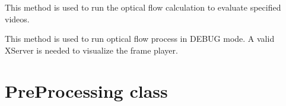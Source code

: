 \documentclass[letterpaper,10pt,english,openany,oneside]{sphinxmanual}
\begin{document}
\begin{fulllineitems}
\begin{fulllineitems}
\begin{quote}
\begin{description}
\end{description}\end{quote}

\end{fulllineitems}


\begin{fulllineitems}
\label{\detokenize{OpticalFlow:cmc.OpticalFlow.OpticalFlow.run_eval}}
This method is used to run the optical flow calculation to evaluate specified videos.

\end{fulllineitems}


\begin{fulllineitems}
\label{\detokenize{OpticalFlow:cmc.OpticalFlow.OpticalFlow.run_manual_evaluation}}
This method is used to run optical flow process in DEBUG mode. A valid X\sphinxhyphen{}Server is needed to visualize the frame player.

\end{fulllineitems}


\end{fulllineitems}



\section{PreProcessing class}
\label{\detokenize{PreProcessing:preprocessing-class}}\label{\detokenize{PreProcessing::doc}}
\end{document}
